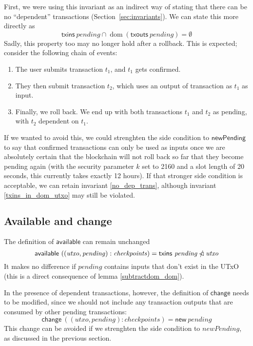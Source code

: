 \documentclass{article}
\DeclareMathOperator{\dom}{dom}
\newcommand{\restrictdom}{\lhd}
\newcommand{\subtractdom}{\mathbin{\slashed{\restrictdom}}}
\begin{document}
First, we were using this invariant as an indirect way of stating that there
can be no ``dependent'' transactions (Section~\ref{sec:invariants}). We can
state this more directly as
%
\begin{equation} \label{no_dep_trans}
\mathsf{txins} ~ \mathit{pending} \cap \dom (\mathsf{txouts} ~ \mathit{pending}) = \emptyset
\end{equation}
%
Sadly, this property too may no longer hold after a rollback. This is expected;
consider the following chain of events:
%
\begin{enumerate}
\item The user submits transaction $t_1$, and $t_1$ gets confirmed.
\item They then submit transaction $t_2$, which uses an output of transaction as $t_1$ as input.
\item Finally, we roll back. We end up with both transactions $t_1$ and $t_2$ as pending, with $t_2$ dependent on $t_1$.
\end{enumerate}

If we wanted to avoid this, we could strenghten the side condition to
$\mathsf{newPending}$ to say that confirmed transactions can only be used as
inputs once we are absolutely certain that the blockchain will not roll back so
far that they become pending again (with the security parameter $k$ set to 2160
and a slot length of 20 seconds, this currently takes exactly 12 hours). If that
stronger side condition is acceptable, we can retain invariant
\eqref{no_dep_trans}, although invariant \eqref{txins_in_dom_utxo} may still be
violated.

\subsection{Available and change}

The definition of $\mathsf{available}$ can remain unchanged
%
\begin{equation}
  \mathsf{available} ~ ((\mathit{utxo}, \mathit{pending}) : \mathit{checkpoints})
= \mathsf{txins} ~ \mathit{pending} \subtractdom \mathit{utxo} \\
\end{equation}
%
It makes no difference if  $\mathit{pending}$ contains
inputs that don't exist in the UTxO (this is a direct consequence of
lemma \eqref{subtractdom_dom}).

In the presence of dependent transactions, however, the definition of
$\mathsf{change}$ needs to be modified, since we should not include any
transaction outputs that are consumed by other pending transactions:
%
\begin{equation*}
  \mathsf{change} ~ ((\mathit{utxo}, \mathit{pending}) : \mathit{checkpoints})
= \mathsf{new} ~ \mathit{pending}
\end{equation*}
%
This change can be avoided if we strenghten the side condition to
$\mathit{newPending}$, as discussed in the previous section.
\end{document}
